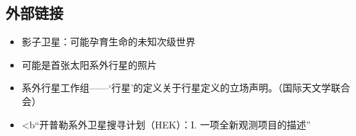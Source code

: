 \subsection{外部链接}
\begin{itemize}
\item 影子卫星：可能孕育生命的未知次级世界
\item 可能是首张太阳系外行星的照片
\item 系外行星工作组——‘行星’的定义关于行星定义的立场声明。（国际天文学联合会）
\item <b“开普勒系外卫星搜寻计划（HEK）：I. 一项全新观测项目的描述”
\end{itemize}